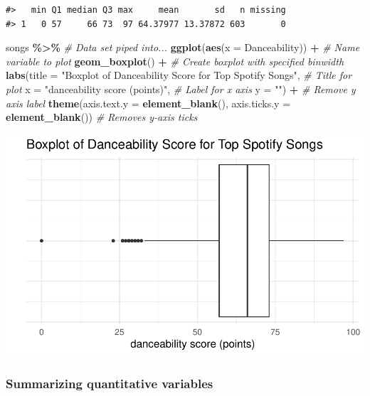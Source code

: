 \documentclass[
]{report}
\newenvironment{Shaded}{\begin{snugshade}}{\end{snugshade}}
\newcommand{\AttributeTok}[1]{\textcolor[rgb]{0.13,0.29,0.53}{#1}}
\newcommand{\CommentTok}[1]{\textcolor[rgb]{0.56,0.35,0.01}{\textit{#1}}}
\newcommand{\FunctionTok}[1]{\textcolor[rgb]{0.13,0.29,0.53}{\textbf{#1}}}
\newcommand{\NormalTok}[1]{#1}
\newcommand{\SpecialCharTok}[1]{\textcolor[rgb]{0.81,0.36,0.00}{\textbf{#1}}}
\newcommand{\StringTok}[1]{\textcolor[rgb]{0.31,0.60,0.02}{#1}}
\begin{document}
\begin{verbatim}
#>   min Q1 median Q3 max     mean       sd   n missing
#> 1   0 57     66 73  97 64.37977 13.37872 603       0
\end{verbatim}

\begin{Shaded}
\begin{Highlighting}[]
\NormalTok{songs }\SpecialCharTok{\%\textgreater{}\%} \CommentTok{\# Data set piped into...}
    \FunctionTok{ggplot}\NormalTok{(}\FunctionTok{aes}\NormalTok{(}\AttributeTok{x =}\NormalTok{ Danceability)) }\SpecialCharTok{+}   \CommentTok{\# Name variable to plot}
    \FunctionTok{geom\_boxplot}\NormalTok{() }\SpecialCharTok{+}  \CommentTok{\# Create boxplot with specified binwidth}
    \FunctionTok{labs}\NormalTok{(}\AttributeTok{title =} \StringTok{"Boxplot of Danceability Score for Top Spotify Songs"}\NormalTok{, }\CommentTok{\# Title for plot}
         \AttributeTok{x =} \StringTok{"danceability score (points)"}\NormalTok{, }\CommentTok{\# Label for x axis}
         \AttributeTok{y =} \StringTok{""}\NormalTok{) }\SpecialCharTok{+} \CommentTok{\# Remove y axis label}
    \FunctionTok{theme}\NormalTok{(}\AttributeTok{axis.text.y =} \FunctionTok{element\_blank}\NormalTok{(), }
          \AttributeTok{axis.ticks.y =} \FunctionTok{element\_blank}\NormalTok{()) }\CommentTok{\# Removes y{-}axis ticks}
\end{Highlighting}
\end{Shaded}

\begin{center}\includegraphics[width=0.7\linewidth]{07-A14-onemean-CI_files/figure-latex/unnamed-chunk-2-1} \end{center}

\subsubsection*{Summarizing quantitative variables}\label{summarizing-quantitative-variables-2}
\end{document}
